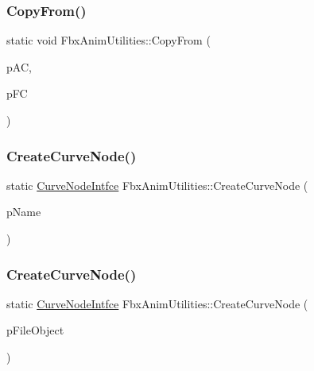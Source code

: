 \mbox{\label{class_fbx_anim_utilities_accddd7a975ab0eb0f042903846a14704}} 
\subsubsection{\texorpdfstring{Copy\+From()}{CopyFrom()}}
{\footnotesize\ttfamily static void Fbx\+Anim\+Utilities\+::\+Copy\+From (\begin{DoxyParamCaption}\item[{\hyperlink{class_fbx_anim_curve}{Fbx\+Anim\+Curve} $\ast$}]{p\+AC,  }\item[{\hyperlink{class_fbx_anim_utilities_1_1_curve_intfce}{Curve\+Intfce} \&}]{p\+FC }\end{DoxyParamCaption})\hspace{0.3cm}{\ttfamily [static]}}

\mbox{\label{class_fbx_anim_utilities_a989f371a71e08e7bdd2d0ac7f3a9bc76}} 
\subsubsection{\texorpdfstring{Create\+Curve\+Node()}{CreateCurveNode()}\hspace{0.1cm}{\footnotesize\ttfamily [1/3]}}
{\footnotesize\ttfamily static \hyperlink{class_fbx_anim_utilities_1_1_curve_node_intfce}{Curve\+Node\+Intfce} Fbx\+Anim\+Utilities\+::\+Create\+Curve\+Node (\begin{DoxyParamCaption}\item[{const char $\ast$}]{p\+Name }\end{DoxyParamCaption})\hspace{0.3cm}{\ttfamily [static]}}

\mbox{\label{class_fbx_anim_utilities_aceaa489cb52448cb054998332e7cf1eb}} 
\subsubsection{\texorpdfstring{Create\+Curve\+Node()}{CreateCurveNode()}\hspace{0.1cm}{\footnotesize\ttfamily [2/3]}}
{\footnotesize\ttfamily static \hyperlink{class_fbx_anim_utilities_1_1_curve_node_intfce}{Curve\+Node\+Intfce} Fbx\+Anim\+Utilities\+::\+Create\+Curve\+Node (\begin{DoxyParamCaption}\item[{\hyperlink{class_fbx_i_o}{Fbx\+IO} $\ast$}]{p\+File\+Object }\end{DoxyParamCaption})\hspace{0.3cm}{\ttfamily [static]}}

